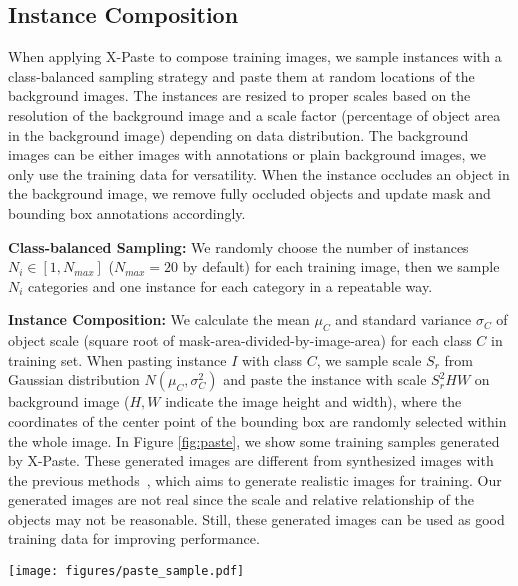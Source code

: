 \documentclass{article}
\begin{document}
\subsection{Instance Composition} 
When applying X-Paste to compose training images, we sample instances with a class-balanced sampling strategy and paste them at random locations of the background images. The instances are resized to proper scales based on the resolution of the background image and a scale factor (percentage of object area in the background image) depending on data distribution. The background images can be either images with annotations or plain background images, we only use the training data for versatility. When the instance occludes an object in the background image, we remove fully occluded objects and update mask and bounding box annotations accordingly.

\noindent\textbf{Class-balanced Sampling:} We randomly choose the number of instances $N_i \in [1, N_{max}]$ ($N_{max}=20$ by default) for each training image, then we sample $N_i$ categories and one instance for each category in a repeatable way.

\noindent\textbf{Instance Composition:} We calculate the mean $\mu_{C}$ and standard variance $\sigma_{C}$ of object scale (square root of mask-area-divided-by-image-area) for each class $C$ in training set. When pasting instance $I$ with class $C$, we sample scale $S_r$ from Gaussian distribution $N(\mu_{C},\sigma^2_{C})$ and paste the instance with scale $S_r^2HW$ on background image ($H,W$ indicate the image height and width), where the coordinates of the center point of the bounding box are randomly selected within the whole image. In Figure \ref{fig:paste}, we show some training samples generated by X-Paste. These generated images are different from synthesized images with the previous methods~\cite{Instaboost, Contextual-Copy-Paste}, which aims to generate realistic images for training. Our generated images are not real since the  scale and relative relationship of the objects may not be reasonable. Still, these generated images can be used as good training data for improving performance.

\begin{figure*}
\centering
\texttt{[image: figures/paste\_sample.pdf]}
\vspace{-1em}
\caption{Visualization of training samples synthesized by X-Paste.}
\label{fig:paste}
\vspace{-1em}
\end{figure*}
\end{document}
